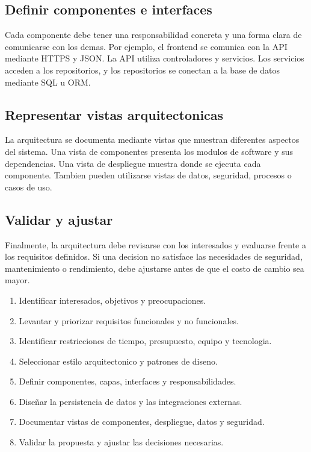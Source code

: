 \documentclass[12pt,letterpaper]{article}
\begin{document}
\subsection{Definir componentes e interfaces}

Cada componente debe tener una responsabilidad concreta y una forma clara de comunicarse con los demas. Por ejemplo, el frontend se comunica con la API mediante HTTPS y JSON. La API utiliza controladores y servicios. Los servicios acceden a los repositorios, y los repositorios se conectan a la base de datos mediante SQL u ORM.

\subsection{Representar vistas arquitectonicas}

La arquitectura se documenta mediante vistas que muestran diferentes aspectos del sistema. Una vista de componentes presenta los modulos de software y sus dependencias. Una vista de despliegue muestra donde se ejecuta cada componente. Tambien pueden utilizarse vistas de datos, seguridad, procesos o casos de uso.

\subsection{Validar y ajustar}

Finalmente, la arquitectura debe revisarse con los interesados y evaluarse frente a los requisitos definidos. Si una decision no satisface las necesidades de seguridad, mantenimiento o rendimiento, debe ajustarse antes de que el costo de cambio sea mayor.

\begin{enumerate}[leftmargin=1.2cm]
    \item Identificar interesados, objetivos y preocupaciones.
    \item Levantar y priorizar requisitos funcionales y no funcionales.
    \item Identificar restricciones de tiempo, presupuesto, equipo y tecnologia.
    \item Seleccionar estilo arquitectonico y patrones de diseno.
    \item Definir componentes, capas, interfaces y responsabilidades.
    \item Diseñar la persistencia de datos y las integraciones externas.
    \item Documentar vistas de componentes, despliegue, datos y seguridad.
    \item Validar la propuesta y ajustar las decisiones necesarias.
\end{enumerate}
\end{document}
